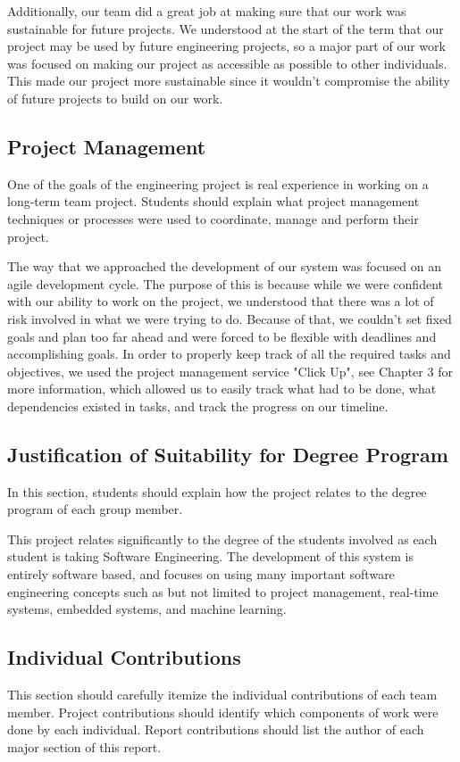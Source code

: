 \documentclass[titlepage]{article}
\begin{document}
Additionally, our team did a great job at making sure that our work was sustainable for future projects. We understood at the start of the term that our project may be used by future engineering projects, so a major part of our work was focused on making our project as accessible as possible to other individuals. This made our project more sustainable since it wouldn't compromise the ability of future projects to build on our work.

\subsection{Project Management}
One of the goals of the engineering project is real experience in working on a long-term team project. Students should explain what project management techniques or processes were used to coordinate, manage and perform their project.

The way that we approached the development of our system was focused on an agile development cycle. The purpose of this is because while we were confident with our ability to work on the project, we understood that there was a lot of risk involved in what we were trying to do. Because of that, we couldn't set fixed goals and plan too far ahead and were forced to be flexible with deadlines and accomplishing goals. In order to properly keep track of all the required tasks and objectives, we used the project management service "Click Up", see Chapter 3 for more information, which allowed us to easily track what had to be done, what dependencies existed in tasks, and track the progress on our timeline.

\subsection{Justification of Suitability for Degree Program}
In this section, students should explain how the project
relates to the degree program of each group member.

This project relates significantly to the degree of the students involved as each student is taking Software Engineering. The development of this system is entirely software based, and focuses on using many important software engineering concepts such as but not limited to project management, real-time systems, embedded systems, and machine learning. 


\subsection{Individual Contributions}
This section should carefully itemize the individual contributions of each team member. Project contributions should identify which components of work were done by each  individual. Report contributions should list the author of  each major section of this report.
\end{document}
